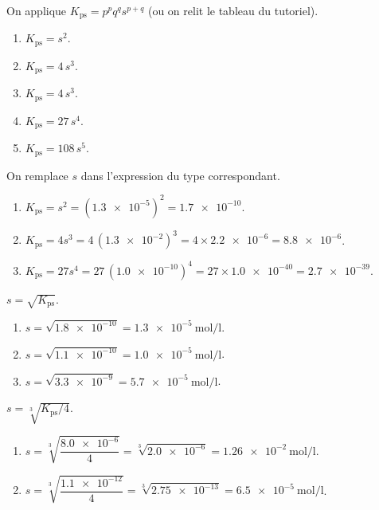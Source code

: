 \documentclass[11pt,a4paper]{article}
\begin{document}
\begin{corrige}
On applique $K_{\mathrm{ps}}=p^{p}q^{q}s^{p+q}$ (ou on relit le tableau du tutoriel).
\begin{enumerate}[label=\alph*)]
  \item $K_{\mathrm{ps}} = s^{2}$.
  \item $K_{\mathrm{ps}} = 4\,s^{3}$.
  \item $K_{\mathrm{ps}} = 4\,s^{3}$.
  \item $K_{\mathrm{ps}} = 27\,s^{4}$.
  \item $K_{\mathrm{ps}} = 108\,s^{5}$.
\end{enumerate}
\end{corrige}

\begin{corrige}
On remplace $s$ dans l'expression du type correspondant.
\begin{enumerate}[label=\alph*)]
  \item $K_{\mathrm{ps}} = s^{2} = (\num{1.3e-5})^{2} = \num{1.7e-10}$.
  \item $K_{\mathrm{ps}} = 4s^{3} = 4\,(\num{1.3e-2})^{3} = 4\times\num{2.2e-6} = \num{8.8e-6}$.
  \item $K_{\mathrm{ps}} = 27s^{4} = 27\,(\num{1.0e-10})^{4} = 27\times\num{1.0e-40} = \num{2.7e-39}$.
\end{enumerate}
\end{corrige}

\begin{corrige}
$s=\sqrt{K_{\mathrm{ps}}}$.
\begin{enumerate}[label=\alph*)]
  \item $s = \sqrt{\num{1.8e-10}} = \qty{1.3e-5}{\mole\per\litre}$.
  \item $s = \sqrt{\num{1.1e-10}} = \qty{1.0e-5}{\mole\per\litre}$.
  \item $s = \sqrt{\num{3.3e-9}} = \qty{5.7e-5}{\mole\per\litre}$.
\end{enumerate}
\end{corrige}

\begin{corrige}
$s=\sqrt[3]{K_{\mathrm{ps}}/4}$.
\begin{enumerate}[label=\alph*)]
  \item $s = \sqrt[3]{\dfrac{\num{8.0e-6}}{4}} = \sqrt[3]{\num{2.0e-6}} = \qty{1.26e-2}{\mole\per\litre}$.
  \item $s = \sqrt[3]{\dfrac{\num{1.1e-12}}{4}} = \sqrt[3]{\num{2.75e-13}} = \qty{6.5e-5}{\mole\per\litre}$.
\end{enumerate}
\end{corrige}
\end{document}
